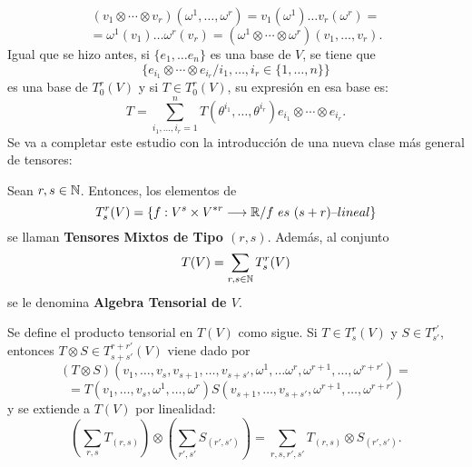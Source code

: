 \documentclass[cursovd_portada.tex]{subfiles}
\begin{document}
$$(v_1\otimes\cdots\otimes v_r)(\omega^1,\dots ,\omega^r)=
v_1(\omega^1)\dots v_r(\omega^r)=$$
$$=\omega^1(v_1)\dots\omega^r(v_r)=(\omega^1\otimes\cdots\otimes\omega^r)(v_1,
\dots ,v_r).$$ \hs Igual que se hizo antes, si $\{e_1, \dots e_n\}$ es una base de $V$, se tiene que
$$\{e_{i_1}\otimes\cdots\otimes e_{i_r}/i_1,\dots ,i_r\in\{1,\dots ,n\}\}$$
es una base de $T^r_0(V)$ y si $T\in T^r_0(V)$, su expresi\'{o}n en esa base es:
$$T=\sum_{i_1,\dots,i_r=1}^{n}T(\theta^{i_1},\dots ,\theta^{i_r})e_{i_1}
\otimes\cdots\otimes e_{i_r}.$$ \hs Se va a completar este estudio con la introducci\'{o}n de una nueva clase m\'{a}s
general de tensores:
\begin{defiap}
Sean $r,s\in\mathbb{N}$. Entonces, los elementos de
$$T^r_s(V)=\{f:V^s\times V^{*r}\longrightarrow\mathbb{R} /f\mbox{ }es\mbox{ }(s+r)\mbox{--}lineal
\}$$ se llaman {\bf Tensores Mixtos de Tipo $(r,s)$}. Adem\'{a}s, al conjunto
$$T(V)=\sum_{r,s\in\mathbb{N}}T^r_s(V)$$
se le denomina {\bf Algebra Tensorial de $V$}.
\end{defiap}
\par\bigskip
Se define el producto tensorial en $T(V)$ como sigue. Si $T\in T^r_s(V)$ y $S \in T^{r'}_{s'}$, entonces $T\otimes
S\in T^{r+r'}_{s+s'}(V)$ viene dado por
$$(T\otimes S)(v_1,\dots, v_s,v_{s+1},\dots ,v_{s+s'},\omega^1,\dots\omega^r,
\omega^{r+1},\dots ,\omega^{r+r'})=$$
$$=T(v_1,\dots ,v_s,\omega^1,\dots ,\omega^r)S(v_{s+1},\dots, v_{s+s'},\omega^
{r+1},\dots ,\omega^{r+r'})$$ y se extiende a $T(V)$ por linealidad:
$$(\sum_{r,s}T_{(r,s)})\otimes(\sum_{r',s'}S_{(r',s')})=\sum_{r,s,r',s'}T_{(
r,s)}\otimes S_{(r',s')}.$$

\newpage
\end{document}
